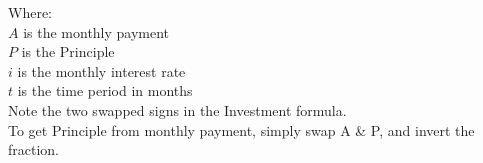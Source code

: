 \documentclass[11pt]{article}
\begin{document}
    Where: \\
    $A$ is the monthly payment \\
    $P$ is the Principle \\
    $i$ is the monthly interest rate \\
    $t$ is the time period in months \\

    Note the two swapped signs in the Investment formula. \\
    To get Principle from monthly payment, simply swap A \& P, and invert the fraction.
\end{document}
